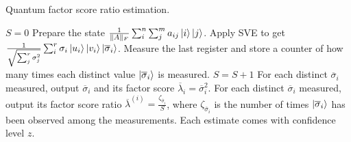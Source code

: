 \documentclass{article}
\begin{document}
\pagestyle{empty}

\begin{algorithm}[H]
	\caption{Quantum factor score ratio estimation.}
	\begin{algorithmic}[1]
		\State $S=0$
	    \State Prepare the state
    	$\frac{1}{\|A\|_F}\sum_{i}^{n}\sum_{j}^{m}a_{ij}\ket{i}\ket{j}$.
	    \State Apply SVE to get $\frac{1}{\sqrt{\sum_{j}^{r}\sigma_j^2}}\sum_{i}^{r} \sigma_i \ket{u_i}\ket{v_i}\ket{\overline{\sigma}_i}$.
	    \State Measure the last register and store a counter of how many times each distinct value $\ket{\overline{\sigma}_i}$ is measured. 
	    \State $S = S + 1$
	    \EndWhile
	    \State For each distinct $\overline{\sigma}_i$ measured, output $\overline{\sigma}_i$ and its factor score $\overline{\lambda}_i = \overline{\sigma}^2_i$.
		\State For each distinct $\overline{\sigma}_i$ measured, output its factor score ratio 
		$\overline{\lambda}^{(i)} = \frac{\zeta_{\overline{\sigma}_i}}{S}$,
		where $\zeta_{\overline{\sigma}_i}$ is the number of times $\ket{\overline{\sigma}_i}$ has been observed among the measurements.
		Each estimate comes with confidence level $z$.
	\end{algorithmic}
\end{algorithm} 
\end{document}
